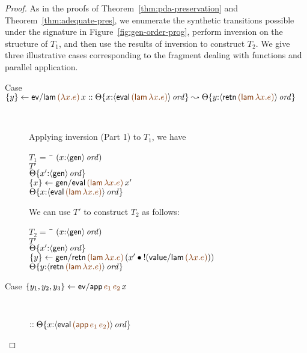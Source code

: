 \begin{proof} As in the proofs of Theorem~\ref{thm:pda-preservation}
  and Theorem~\ref{thm:adequate-pres}, we enumerate the synthetic
  transitions possible under the signature in
  Figure~\ref{fig:gen-order-prog}, perform inversion on the structure
  of $T_1$, and then use the results of inversion to construct
  $T_2$. We give three illustrative cases corresponding to the
  fragment dealing with functions and parallel application.

\begin{description}
\item 
  [Case $\trstep{y}{{\sf ev/lam}\,\lf{(\lambda x. e)}\,x}
   ::
   \tackon{\Theta}
     {x{:}\istrue{\susp{{\sf eval}\,\lf{({\sf lam}\,\lambda x.e)}}}}
   \leadsto
   \tackon{\Theta}
     {y{:}\istrue{\susp{{\sf retn}\,\lf{({\sf lam}\,\lambda x.e)}}}}$]~

\medskip
Applying inversion (Part 1) to $T_1$, we have 

\begin{tabbing}
$T_1 = ~$ \= \qquad \= $(x{:}{\langle {\sf gen} \rangle}\,{{\it ord}})$
\\
\>$T'$
\\
\>\>${\Theta}\{{x'{:}{\langle {\sf gen} \rangle}\,{{\it ord}}}\}$
\\
\>$\trstep{x}{{\sf gen/eval}\,\lf{({\sf lam}\,\lambda x.e)}\,x'}$
\\
\>\>$\tackon{\Theta}
       {x{:}\istrue{\susp{{\sf eval}\,\lf{({\sf lam}\,\lambda x.e)}}}}$
\end{tabbing}

We can use $T'$ to construct $T_2$ as follows:

\begin{tabbing}
$T_2 = ~$ \= \qquad \= $(x{:}{\langle {\sf gen} \rangle}\,{{\it ord}})$
\\
\>$T'$
\\
\>\>${\Theta}\{{x'{:}{\langle {\sf gen} \rangle}\,{{\it ord}}}\}$
\\
\>$\trstep{y}{{\sf gen/retn}\,\lf{({\sf lam}\,\lambda x.e)}\,(\tfuser{x'}{\tbangr{({\sf value/lam}\,\lf{(\lambda x.e)})}})}$
\\
\>\>$\tackon{\Theta}
     {y{:}\istrue{\susp{{\sf retn}\,\lf{({\sf lam}\,\lambda x.e)}}}}$
\end{tabbing}

\item 
  [Case $\trstep{y_1, y_2, y_3}{{\sf ev/app}\,\lf{e_1}\,\lf{e_2}\,x}$]~

\qquad
  $::
   \tackon{\Theta}
     {x{:}\istrue{\susp{{\sf eval}\,\lf{({\sf app}\,e_1\,e_2)}}}}$


\end{description}
\end{proof}
